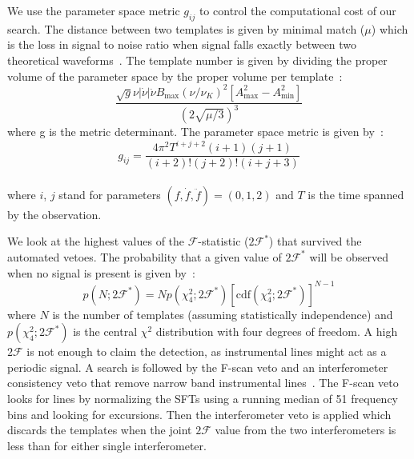 \documentclass{ttuthes2007}
\begin{document}
We use the parameter space metric $g_{ij}$ to control the computational
cost of our search. 
The distance between two templates is given by minimal
match ($\mu$) which is the loss in signal to noise ratio when signal falls
exactly between two theoretical waveforms~\cite{Owen_1996}.  
The template number is given by dividing the proper volume of the parameter
space by the proper volume per template~\cite{PhysRevD.100.064013}:
\begin{equation}\label{templatescalc}
\frac{\sqrt{g} \nu \left| \dot\nu \right| \ddot\nu B_{\max} \left(\nu/\nu_K
\right)^2 \left[ A_{\max}^2 - A_{\min}^2 \right]}{\left( 2 \sqrt{\mu/3}
\right)^3}
\end{equation}
where g is the metric determinant.
The parameter space metric is given by~\cite{Wette:2008hg,Owen_1996}:
\begin{equation}
g_{ij}=\frac{4\pi^2T^{i+j+2}(i+1)(j+1)}{(i+2)!(j+2)!(i+j+3)}
\end{equation}\\
where $i$, $j$ stand for parameters $(f,\dot{f},\ddot{f})=(0,1,2)$ and $T$ is the time spanned by the observation. 

We look at the highest values of the $\mathcal{F}$-statistic
($2\mathcal{F}^*$) that survived the automated vetoes. The probability that a
given value of $2\mathcal{F}^*$ will be observed when no signal is present is
given by~\cite{Abadie_2010}: 
\begin{equation} 
p(N;2\mathcal{F}^*)= Np(\chi^2_4;2\mathcal{F}^*)[\mathrm{cdf}(\chi^2_4;2\mathcal{F}^*)]^{N-1} 
\end{equation} 
where $N$ is the number of templates (assuming statistically independence) and $p(\chi^2_4;2\mathcal{F}^*)$ is the
central $\chi^2$ distribution with four degrees of freedom. A high
$2\mathcal{F}$ is not enough to claim the detection, as instrumental lines might
act as a periodic signal. A search is followed by the F-scan veto and
an interferometer consistency veto that remove narrow band instrumental
lines~\cite{Lindblom_2020}. The F-scan veto looks for lines by normalizing the
\acp{SFT}  using a running median of 51 frequency bins and looking for
excursions. Then the interferometer
veto is applied which discards the templates when the joint $2\mathcal{F}$
value from the two interferometers is less than for either single interferometer.

	
\end{document}
